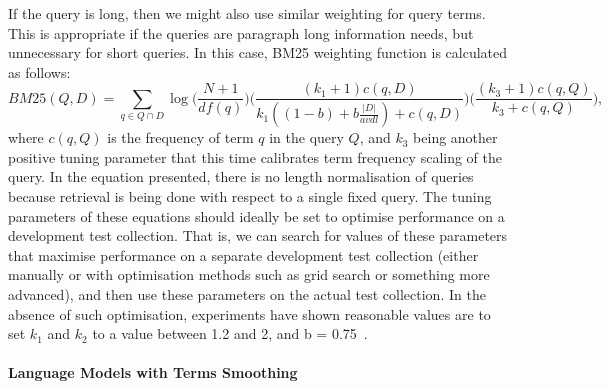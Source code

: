 If the query is long, then we might also use similar weighting for query terms. This is appropriate if the queries are paragraph long information needs, but unnecessary for short queries. 
In this case, BM25 weighting function is calculated as follows:
\begin{equation}
BM25(Q,D)=\sum\limits_{q \in Q\cap D}\log\Bigg(\frac{N+1}{df(q)}\Bigg)\Bigg(\frac{(k_{1}+1)c(q,D)}{k_{1}((1-b)+b\frac{|D|}{avdl})+c(q,D)}\Bigg)\Bigg(\frac{(k_{3}+1)c(q,Q)}{k_{3}+c(q,Q)}\Bigg),
\label{eq:idfbm25}
\end{equation}
where $ c(q,Q) $ is the frequency of term $ q $ in the query $ Q $, and $ k_{3} $ being another positive tuning parameter that this time calibrates term frequency scaling of the query. In the equation presented, there is no length normalisation of
queries because retrieval is being done with respect to a single fixed query. The tuning parameters of these equations should ideally be set to optimise performance on a development test collection. That is, we can search for values of these parameters that maximise performance on a separate development test collection (either manually or with optimisation methods such as grid search or something more advanced), and then use these parameters on the actual test collection. In the absence of such optimisation, experiments have shown reasonable values are to set $ k_{1} $ and $ k_{2} $ to a value between 1.2 and 2, and b = 0.75~\citep{manning2008introduction}.
\paragraph{Language Models with Terms Smoothing}
\ \\
